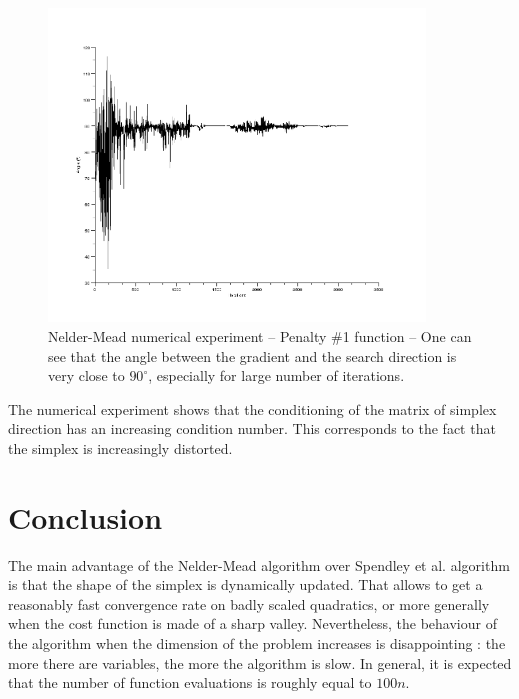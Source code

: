 \begin{figure}
\begin{center}
\includegraphics[width=10cm]{torczon_test1_angle.png}
\end{center}
\caption{Nelder-Mead numerical experiment -- Penalty \#1 function --
One can see that the angle between the gradient and the search direction
is very close to $90^{\circ}$, especially for large number of iterations.}
\label{fig-nm-numexp-torczon1}
\end{figure}

The numerical experiment shows that the conditioning of the matrix 
of simplex direction has an increasing condition number. This corresponds to the 
fact that the simplex is increasingly distorted.

\section{Conclusion}

The main advantage of the Nelder-Mead algorithm over Spendley et al.
algorithm is that the shape of the simplex is dynamically updated.
That allows to get a reasonably fast convergence rate on badly scaled
quadratics, or more generally when the cost function is made 
of a sharp valley. Nevertheless, the behaviour of the algorithm when the 
dimension of the problem increases is disappointing : the more there are 
variables, the more the algorithm is slow. In general, it is expected 
that the number of function evaluations is roughly equal to $100n$.



